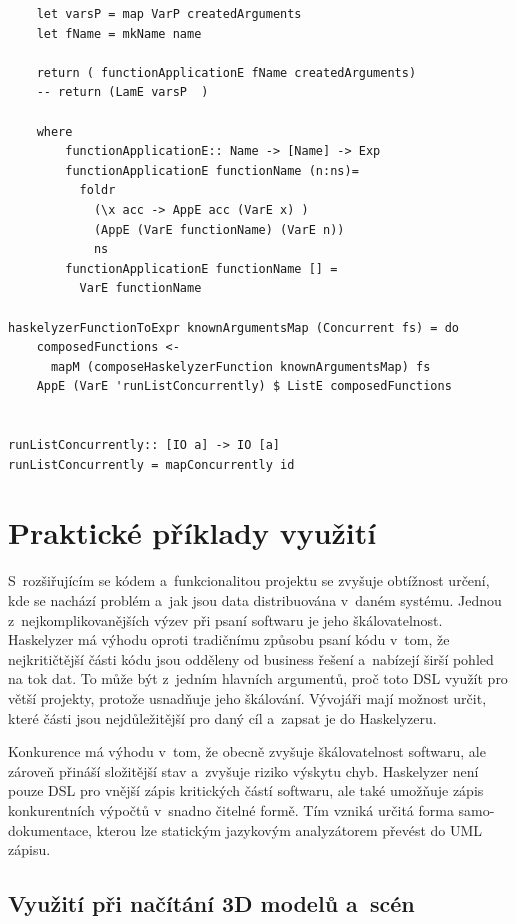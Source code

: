 \documentclass[male, czech]{kithesis}
\begin{document}
\begin{verbatim}
    let varsP = map VarP createdArguments 
    let fName = mkName name

    return ( functionApplicationE fName createdArguments)
    -- return (LamE varsP  )

    where
        functionApplicationE:: Name -> [Name] -> Exp
        functionApplicationE functionName (n:ns)= 
          foldr 
            (\x acc -> AppE acc (VarE x) ) 
            (AppE (VarE functionName) (VarE n)) 
            ns
        functionApplicationE functionName [] = 
          VarE functionName

haskelyzerFunctionToExpr knownArgumentsMap (Concurrent fs) = do
    composedFunctions <- 
      mapM (composeHaskelyzerFunction knownArgumentsMap) fs
    AppE (VarE 'runListConcurrently) $ ListE composedFunctions


runListConcurrently:: [IO a] -> IO [a]
runListConcurrently = mapConcurrently id

\end{verbatim}

\chapter{Praktické příklady využití}

S~rozšiřujícím se kódem a~funkcionalitou projektu se zvyšuje obtížnost určení, 
kde se nachází problém a~jak jsou data distribuována v~daném systému. 
Jednou z~nejkomplikovanějších výzev při psaní softwaru je jeho škálovatelnost. 
Haskelyzer má výhodu oproti tradičnímu způsobu psaní kódu v~tom, 
že nejkritičtější části kódu jsou odděleny od business řešení a~nabízejí širší pohled na tok dat. 
To může být z~jedním hlavních argumentů, 
proč toto DSL využít pro větší projekty,
protože usnadňuje jeho škálování.
Vývojáři mají možnost určit, které části jsou nejdůležitější pro daný cíl a~zapsat je do Haskelyzeru.

Konkurence má výhodu v~tom, že obecně zvyšuje škálovatelnost softwaru, 
ale zároveň přináší složitější stav a~zvyšuje riziko výskytu chyb. 
Haskelyzer není pouze DSL pro vnější zápis kritických částí softwaru, 
ale také umožňuje zápis konkurentních výpočtů v~snadno čitelné formě. 
Tím vzniká určitá forma samo-dokumentace, 
kterou lze statickým jazykovým analyzátorem převést do UML zápisu.

\section{Využití při načítání 3D modelů a~scén}
\end{document}
